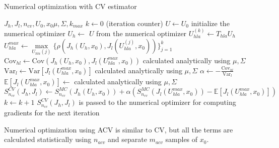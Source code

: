 \documentclass{article}
\begin{document}
\begin{algorithm}
  \caption{Numerical optimization with CV estimator}
  \begin{algorithmic}
    \Require $J_h, J_l, n_{cv}, U_0, x_0 \mu, \Sigma, k_{max}$
    \State $k \gets 0$ (iteration counter)
    \State $U \gets U_0$ initialize the numerical optimizer
    \State $U_h \gets$ $U$ from the numerical optimizer
    \State $U_{hla}^{(k)} \gets T_{hla} U_h$
    \State $U_{hla}^{max} \gets \underset{U_{hla}(j)} \max \{\rho(J_h(U_h, x_0), J_l(U_{hla}^{(j)}, x_0))\}_{j=1}^k$
    \State $\text{Cov}_{hl} \gets \text{Cov}(J_h(U_h, x_0), J_l(U_{hla}^{max}, x_0))$ calculated analytically using $\mu, \Sigma$
    \State $\text{Var}_l \gets \text{Var}[J_l(U_{hla}^{max}, x_0)]$ calculated analytically using $\mu, \Sigma$
    \State $\alpha \gets -\frac{\text{Cov}_{hl}}{\text{Var}_l}$
    \State $\mathbb{E}[J_l(U_{hla}^{max}, x_0)] \gets$ calculated analytically using $\mu, \Sigma$
    \State $S_{n_{cv}}^{CV}(J_h, J_l) \gets S_{n_{cv}}^{MC}(J_h(U_h, x_0)) + \alpha (S_{n_{cv}}^{MC}(J_l(U_{hla}^{max}, x_0)) - \mathbb{E}[J_l(U_{hla}^{max}, x_0)])$
    \State $k \gets k + 1$
    \State $S_{n_{cv}}^{CV}(J_h, J_l)$ is passed to the numerical optimizer for computing gradients for the next iteration
    \EndWhile
  \end{algorithmic}
\end{algorithm}

Numerical optimization using ACV is similar to CV, but all the terms are calculated statistically using $n_{acv}$ and separate
$m_{acv}$ samples of $x_0$.
\end{document}

